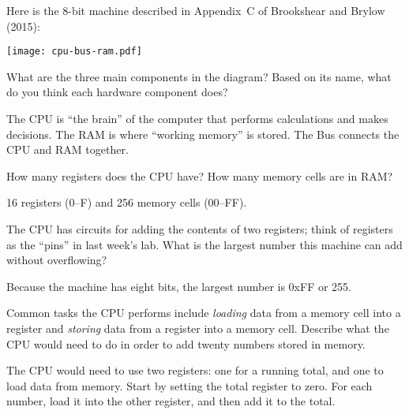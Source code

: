 
Here is the 8-bit machine described in Appendix~C of Brookshear and Brylow (2015):

\begin{center}
\texttt{[image: cpu-bus-ram.pdf]}
\end{center}




\Q What are the three main components in the diagram?
Based on its name, what do you think each hardware component does?

\begin{answer}
The CPU is ``the brain'' of the computer that performs calculations and makes decisions.
The RAM is where ``working memory'' is stored.
The Bus connects the CPU and RAM together.
\end{answer}


\Q How many registers does the CPU have? How many memory cells are in RAM?

\begin{answer}[3em]
16 registers (0--F) and 256 memory cells (00--FF).
\end{answer}


\Q The CPU has circuits for adding the contents of two registers; think of registers as the ``pins'' in last week's lab.
What is the largest number this machine can add without overflowing?

\begin{answer}
Because the machine has eight bits, the largest number is 0xFF or 255.
\end{answer}


\Q Common tasks the CPU performs include \emph{loading} data from a memory cell into a register and \emph{storing} data from a register into a memory cell.
Describe what the CPU would need to do in order to add twenty numbers stored in memory.

\begin{answer}[7em]
The CPU would need to use two registers: one for a running total, and one to load data from memory.
Start by setting the total register to zero.
For each number, load it into the other register, and then add it to the total.
\end{answer}
